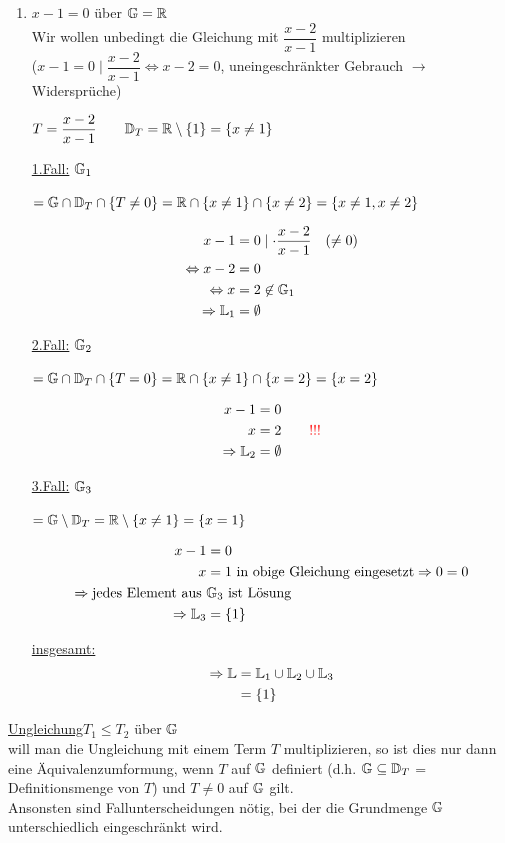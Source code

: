 \begin{itemize}
\begin{enumerate}
\begin{enumerate}
			\item $x-1 = 0$ über $\mathbb{G}=\mathbb{R}$\\
			Wir wollen unbedingt die Gleichung mit $\dfrac{x-2}{x-1}$ multiplizieren\\
			($x-1=0\mid\dfrac{x-2}{x-1} \Leftrightarrow x-2 = 0$, uneingeschränkter Gebrauch $\rightarrow$ Widersprüche)
			
			$T=\dfrac{x-2}{x-1}\qquad\mathbb{D}_T=\mathbb{R}\setminus\{1\}=\{x\ne1\}$
			
			\ul{1.Fall:} $\mathbb{G}_1$\parbox[t]{5cm}{$=\mathbb{G}\cap \mathbb{D}_T\cap\{T\ne0\}\\=\mathbb{R}\cap \{x\ne1\}\cap\{x\ne2\} \\= \{x\ne1,x\ne2\}$}
			\begin{align*}
			x-1 &= 0 \mid \cdot \dfrac{x-2}{x-1}\quad(\ne0)\\
			\Leftrightarrow x-2 &= 0\\
			\Leftrightarrow x &= 2\not\in\mathbb{G}_1\\
			\Rightarrow\mathbb{L}_1 &= \emptyset
			\end{align*}
			
			\ul{2.Fall:} $\mathbb{G}_2$\parbox[t]{5cm}{$=\mathbb{G}\cap \mathbb{D}_T\cap\{T=0\}\\=\mathbb{R}\cap \{x\ne1\}\cap\{x=2\} \\= \{x=2\}$}
			\begin{align*}
			x-1 &= 0\\
			x &= 2\qquad\textcolor{red}{!!!}\\
			\Rightarrow\mathbb{L}_2 &=\emptyset
			\end{align*}
			
			\ul{3.Fall:} $\mathbb{G}_3$\parbox[t]{5cm}{$=\mathbb{G}\setminus \mathbb{D}_T\\=\mathbb{R}\setminus \{x\ne1\} \\= \{x=1\}$}
			\begin{align*}
			x-1 &= 0\\
			x &= 1\text{ in obige Gleichung eingesetzt}\Rightarrow 0=0\\
			\Rightarrow \text{jedes Element aus }&\mathbb{G}_3\text{ ist Lösung}\\
			\Rightarrow\mathbb{L}_3 &=\{1\}
			\end{align*}
			
			\ul{insgesamt:}
			\begin{align*}
			\Rightarrow\mathbb{L} &=\mathbb{L}_1\cup\mathbb{L}_2\cup\mathbb{L}_3\\
			&= \{1\}
			\end{align*}
		\end{enumerate}
		
		\clearpage
		\ul{Ungleichung}\qquad $T_1\le T_2$ \qquad über $\mathbb{G}$\\
		will man die Ungleichung mit einem Term $T$ multiplizieren, so ist dies nur dann eine Äquivalenzumformung, wenn $T$ auf $\mathbb{G}$ definiert (d.h. $\mathbb{G}\subseteq\mathbb{D}_T$ = Definitionsmenge von $T$) und $T\ne0$ auf $\mathbb{G}$ gilt.\\
		Ansonsten sind Fallunterscheidungen nötig, bei der die Grundmenge $\mathbb{G}$ unterschiedlich eingeschränkt wird.
		

\end{enumerate}
\end{itemize}
